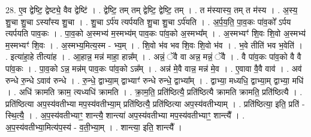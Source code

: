 \documentclass[17pt]{extarticle}
\begin{document}
28. ए॒व द्वेष्टि॒ द्वेष्ट्ये॒ वैव द्वेष्टि॑ । . द्वेष्टि॒ तम् तम् द्वेष्टि॒ द्वेष्टि॒ तम् । . त म॑स्यास्य॒ तम् त म॑स्य । . अ॒स्य॒ शु॒चा शु॒चा ऽस्या᳚स्य शु॒चा । . शु॒चा ऽर्प॑य त्यर्पयति शु॒चा शु॒चा ऽर्प॑यति । . अ॒र्प॒य॒ति॒ पा॒व॒कः पा॑व॒को᳚ ऽर्पय त्यर्पयति पाव॒कः । . पा॒व॒को अ॒स्मभ्य॑ म॒स्मभ्य॑म् पाव॒कः पा॑व॒को अ॒स्मभ्य᳚म् । . अ॒स्मभ्यꣳ॑ शि॒वः शि॒वो अ॒स्मभ्य॑ म॒स्मभ्यꣳ॑ शि॒वः । . अ॒स्मभ्य॒मित्य॒स्म - भ्य॒म् । . शि॒वो भ॑व भव शि॒वः शि॒वो भ॑व । . भ॒वे तीति॑ भव भ॒वेति॑ । . इत्या॑हा॒हे तीत्या॑ह । . आ॒हान्न॒ मन्न॑ माहा॒ हान्न᳚म् । . अन्नं॒ ॅवै वा अन्न॒ मन्नं॒ ॅवै । . वै पा॑व॒कः पा॑व॒को वै वै पा॑व॒कः । . पा॒व॒को ऽन्न॒ मन्न॑म् पाव॒कः पा॑व॒को ऽन्न᳚म् । . अन्न॑ मे॒वै वान्न॒ मन्न॑ मे॒व । . ए॒वावा वै॒वै वाव॑ । . अव॑ रुन्धे रु॒न्धे ऽवाव॑ रुन्धे । . रु॒न्धे॒ द्वाभ्या॒म् द्वाभ्याꣳ॑ रुन्धे रुन्धे॒ द्वाभ्या᳚म् । . द्वाभ्या॒ मध्यधि॒ द्वाभ्या॒म् द्वाभ्या॒ मधि॑ । . अधि॑ क्रामति क्राम॒ त्यध्यधि॑ क्रामति । . क्रा॒म॒ति॒ प्रति॑ष्ठित्यै॒ प्रति॑ष्ठित्यै क्रामति क्रामति॒ प्रति॑ष्ठित्यै । . प्रति॑ष्ठित्या अप॒स्य॑वतीभ्या मप॒स्य॑वतीभ्या॒म् प्रति॑ष्ठित्यै॒ प्रति॑ष्ठित्या अप॒स्य॑वतीभ्याम् । . प्रति॑ष्ठित्या॒ इति॒ प्रति॑ - स्थि॒त्यै॒ । . अ॒प॒स्य॑वतीभ्याꣳ॒॒ शान्त्यै॒ शान्त्या॑ अप॒स्य॑वतीभ्या मप॒स्य॑वतीभ्याꣳ॒॒ शान्त्यै᳚ । . अ॒प॒स्य॑वतीभ्या॒मित्य॑प॒स्य॑ - व॒ती॒भ्या॒म् । . शान्त्या॒ इति॒ शान्त्यै᳚ । \newline
\end{document}
